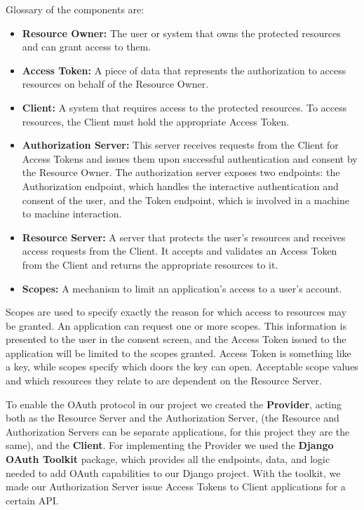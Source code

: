 Glossary of the components are:
\begin{itemize}
	
	\item \textbf{Resource Owner:} The user or system that owns the protected resources and can grant access to them.
	
	\item \textbf{Access Token:} A piece of data that represents the authorization to access resources on behalf of the Resource Owner.
	
	\item \textbf{Client:} A system that requires access to the protected resources. To access resources, the Client must hold the appropriate Access Token.
	
	\item \textbf{Authorization Server:} This server receives requests from the Client for Access Tokens and issues them upon successful authentication and consent by the Resource Owner. The authorization server exposes two endpoints: the Authorization endpoint, which handles the interactive authentication and consent of the user, and the Token endpoint, which is involved in a machine to machine interaction.
	
	\item \textbf{Resource Server:} A server that protects the user’s resources and receives access requests from the Client. It accepts and validates an Access Token from the Client and returns the appropriate resources to it.
	
	\item \textbf{Scopes:} A mechanism to limit an application's access to a user's account.
	
\end{itemize}

Scopes are used to specify exactly the reason for which access to resources may be granted. An application can request one or more scopes. This information is presented to the user in the consent screen, and the Access Token issued to the application will be limited to the scopes granted. Access Token is something like a key, while scopes specify which doors the key can open. Acceptable scope values and which resources they relate to are dependent on the Resource Server.

To enable the OAuth protocol in our project we created the \textbf{Provider}, acting both as the Resource Server and the Authorization Server, (the Resource and Authorization Servers can be separate applications, for this project they are the same), and the \textbf{Client}.
For implementing the Provider we used the \textbf{Django OAuth Toolkit}\cite{oauthtoolkit} package, which provides all the endpoints, data, and logic needed to add OAuth capabilities to our Django project.
With the toolkit, we made our Authorization Server issue Access Tokens to Client applications for a certain API.

